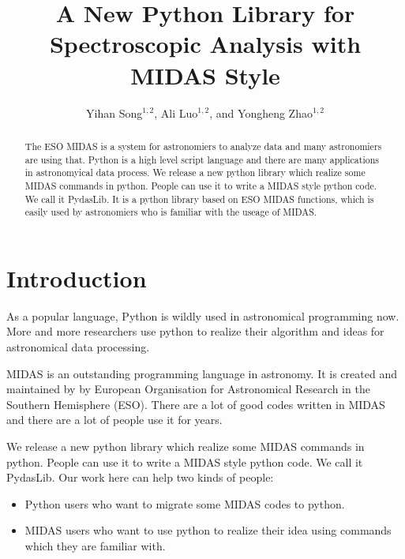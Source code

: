 \documentclass[11pt,twoside]{article}
\begin{document}
\title{A New Python Library for Spectroscopic Analysis with MIDAS Style}
\author{Yihan Song$^{1,2}$, Ali Luo$^{1,2}$, and Yongheng Zhao$^{1,2}$
}

\begin{abstract}
The ESO MIDAS is a system for astronomiers to analyze data and many 
astronomiers are using that. Python is a high level script language and 
there are many applications in astronomyical data process. 
We release a new python library which realize some MIDAS commands in python.
People can use it to write a MIDAS style python code. We call it PydasLib.
It is a python library based on ESO MIDAS functions, which is 
easily used by astronomiers who is familiar with the useage of MIDAS.
\end{abstract}

	  \section{Introduction}
As a popular language, Python is wildly used in astronomical programming now. 
More and more researchers use python to realize their algorithm and ideas for 
astronomical data processing. 

MIDAS is an outstanding programming language in astronomy. It is created and 
maintained by by European Organisation for Astronomical Research in the 
Southern Hemisphere (ESO). 
There are a lot of good codes written in MIDAS and there are a lot of people 
use it for years.

We release a new python library which realize some MIDAS commands in python.
People can use it to write a MIDAS style python code. We call it PydasLib.
Our work here can help two kinds of people:
\begin{itemize}
   \item Python users who want to migrate some MIDAS codes to python. 
   \item MIDAS users who want to use python to realize their idea using commands which 
they are familiar with.
\end{itemize}

% 
\end{document}
